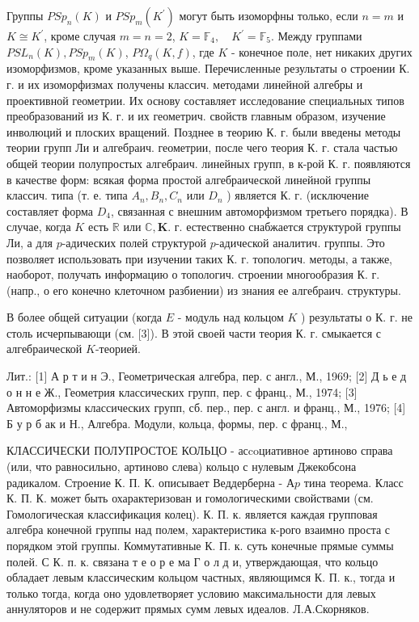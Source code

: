\documentclass[10pt]{article}
\begin{document}
Группы $P S p_{n}(K)$ и $P S p_{m}\left(K^{\prime}\right)$ могут быть изоморфны только, если $n=m$ и $K \cong K^{\prime}$, кроме случая $m=n=2$, $K=\mathbb{F}_{4}, \quad K^{\prime}=\mathbb{F}_{5}$. Между группами $P S L_{n}(K), P S p_{m}(K)$, $P \Omega_{q}(K, f)$, где $K$ - конечное поле, нет никаких других изоморфизмов, кроме указанных выше. Перечисленные результаты о строении К. г. и их изоморфизмах получены классич. методами линейной алгебры и проективной геометрии. Их основу составляет исследование специальных типов преобразований из К. г. и их геометрич. свойств главным образом, изучение инволюций и плоских вращений. Позднее в теорию К. г. были введены методы теории групп Ли и алгебраич. геометрии, после чего теория К. г. стала частью общей теории полупростых алгебраич. линейных групп, в к-рой К. г. появляются в качестве форм: всякая форма простой алгебраической линейной группы классич. типа (т. е. типа $A_{n}, B_{n}, C_{n}$ или $D_{n}$ ) является К. г. (исключение составляет форма $D_{4}$, связанная с внешним автоморфизмом третьего порядка). В случае, когда $K$ есть $\mathbb{R}$ или $\mathbb{C}, \boldsymbol{K}$. г. естественно снабжается структурой группы Ли, а для $p$-адических полей структурой $p$-адической аналитич. группы. Это позволяет использовать при изучении таких К. г. топологич. методы, а также, наоборот, получать информацию о топологич. строении многообразия К. г. (напр., о его конечно клеточном разбиении) из знания ее алгебраич. структуры.



В более общей ситуации (когда $E$ - модуль над кольцом $K$ ) результаты о К. г. не столь исчерпывающи (см. [3]). В этой своей части теория К. г. смыкается с алгебраической $K$-теорией.



Лит.: [1] А р т и н Э., Геометрическая алгебра, пер. с англ., М., 1969; [2] Д ь е д о н н е Ж., Геометрия классических групп, пер. с франц., М., 1974; [3] Автоморфизмы классических групп, сб. пер., пер. с англ. и франц., М., 1976; [4] Б у р б ак и Н., Алгебра. Модули, кольца, формы, пер. с франц., М.,



КЛАССИЧЕСКИ ПОЛУПРОСТОЕ КОЛЬЦО - асcoциативное артиново справа (или, что равносильно, артиново слева) кольцо с нулевым Джекобсона радикалом. Строение К. П. К. описывает Веддерберна - $А p$ тина теорема. Класс К. П. К. может быть охарактеризован и гомологическими свойствами (см. Гомологическая классификация колец). К. П. к. является каждая групповая алгебра конечной группы над полем, характеристика к-рого взаимно проста с порядком этой группы. Коммутативные К. П. к. суть конечные прямые суммы полей. С К. п. к. связана т е о р е ма Г о л д и, утверждающая, что кольцо обладает левым классическим кольцом частных, являющимся К. П. к., тогда и только тогда, когда оно удовлетворяет условию максимальности для левых аннуляторов и не содержит прямых сумм левых идеалов. Л.А.Скорняков.
\end{document}
